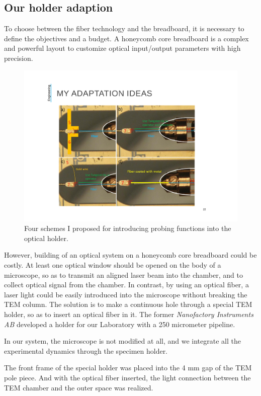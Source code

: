 \subsection{Our holder adaption}
To choose between the fiber technology and the breadboard, it is necessary to define the objectives and a budget. 
A honeycomb core breadboard is a complex and powerful layout to customize optical input/output parameters with high precision. 

\begin{figure}  
\centering
\includegraphics[width=320pt, angle=-90]{figures/figure2_4ways}
\caption[Proposed four ways of holder adaption]{Four schemes I proposed for introducing probing functions into the optical holder.
\label{fig:4ways}}
\end{figure}

However, building of an optical system on a honeycomb core breadboard could be costly. 
At least one optical window should be opened on the body of a microscope, so as to transmit an aligned laser beam into the chamber, and to collect optical signal from the chamber. 
In contrast, by using an optical fiber, a laser light could be easily introduced into the microscope without breaking the TEM column. 
The solution is to make a continuous hole through a special TEM holder, so as to insert an optical fiber in it. The former {\em Nanofactory Instruments AB} developed a holder for our Laboratory with a 250 micrometer pipeline. 

In our system, the microscope is not modified at all, and we integrate all the experimental dynamics through the specimen holder. 

The front frame of the special holder was placed into the 4 mm gap of the TEM pole
piece. And with the optical fiber inserted, the light connection between the TEM chamber and the outer space was realized. 

